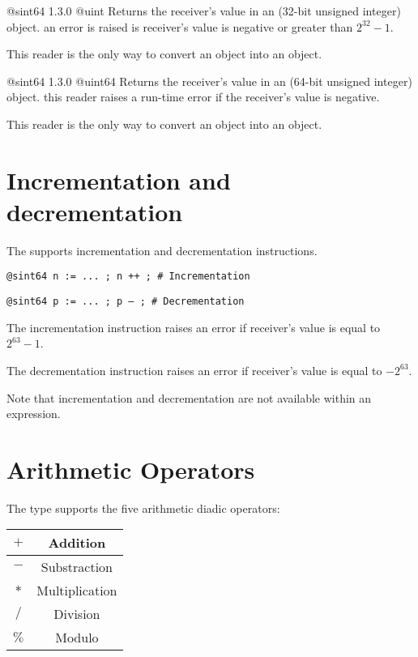 {@sint64}
{1.3.0}
{@uint}
{Returns the receiver's value in an  (32-bit unsigned integer) object.}
{an error is raised is receiver's value is negative or greater than $2^{32}-1$.}

This reader is the only way to convert an  object into an  object.





{@sint64}
{1.3.0}
{@uint64}
{Returns the receiver's value in an  (64-bit unsigned integer) object.}
{this reader raises a run-time error if the receiver's value is negative.}

This reader is the only way to convert an  object into an  object.







\section{Incrementation and decrementation}

The  supports incrementation and decrementation instructions.

\texttt{@sint64 n := ... ; n ++ ; \# Incrementation}

\texttt{@sint64 p := ... ; p -- ; \# Decrementation}\newline

The incrementation instruction raises an error if receiver's value is equal to $2^{63}-1$.\newline

The decrementation instruction raises an error if receiver's value is equal to $-2^{63}$.\newline

Note that incrementation and decrementation are not available within an expression.




\section{Arithmetic Operators}

The  type supports the five arithmetic diadic operators:\newline

\begin{tabular}{|c|c|}
\hline
$+$ & Addition \\
\hline
$-$ & Substraction \\
\hline
$*$ & Multiplication \\
\hline
$/$ & Division \\
\hline
$\%$ & Modulo \\
\hline
\end{tabular}

